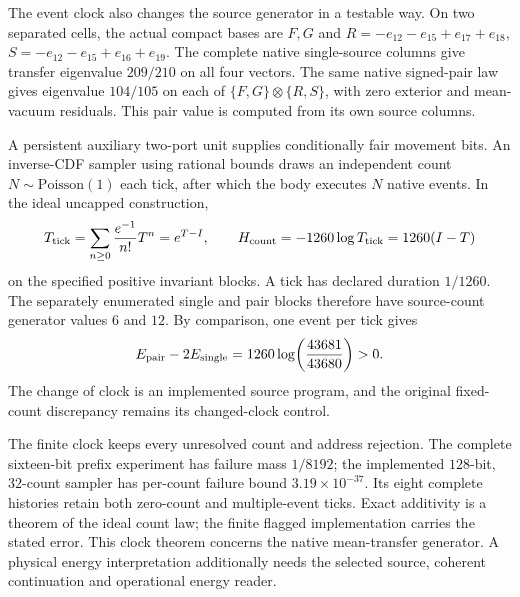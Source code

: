 The event clock also changes the source generator in a testable way.
On two separated cells, the actual compact bases are $F,G$ and
$R=-e_{12}-e_{15}+e_{17}+e_{18}$,
$S=-e_{12}-e_{15}+e_{16}+e_{19}$. The complete native single-source
columns give transfer eigenvalue $209/210$ on all four vectors. The
same native signed-pair law gives eigenvalue $104/105$ on each of
$\{F,G\}\otimes\{R,S\}$, with zero exterior and mean-vacuum residuals.
This pair value is computed from its own source columns.

A persistent auxiliary two-port unit supplies conditionally fair
movement bits. An inverse-CDF sampler using rational bounds draws an
independent count $N\sim\mathrm{Poisson}(1)$ each tick, after which the
body executes $N$ native events. In the ideal uncapped construction,
\[
 T_{\rm tick}=\sum_{n\geq0}\frac{e^{-1}}{n!}T^n=e^{T-I},
 \qquad H_{\rm count}=-1260\log T_{\rm tick}=1260(I-T)
\]
on the specified positive invariant blocks. A tick has declared duration
$1/1260$. The separately enumerated single and pair blocks therefore
have source-count generator values $6$ and $12$. By comparison, one
event per tick gives
\[
 E_{\rm pair}-2E_{\rm single}
 =1260\log\!\left(\frac{43681}{43680}\right)>0.
\]
The change of clock is an implemented source program, and the original
fixed-count discrepancy remains its changed-clock control.

The finite clock keeps every unresolved count and address rejection.
The complete sixteen-bit prefix experiment has failure mass $1/8192$;
the implemented $128$-bit, $32$-count sampler has per-count failure
bound $3.19\times10^{-37}$. Its eight complete histories retain both
zero-count and multiple-event ticks. Exact additivity is a theorem of
the ideal count law; the finite flagged implementation carries the
stated error. This clock theorem concerns the native mean-transfer
generator. A physical energy interpretation additionally needs the
selected source, coherent continuation and operational energy reader.

